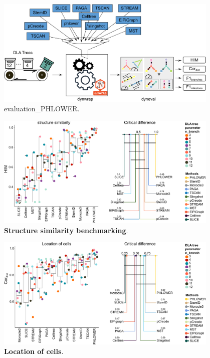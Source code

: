 \begin{figure}[!ht]
	\centering
	\includegraphics[width=0.95\textwidth]{evaluation_PHLOWER/fig}
	\vspace{0.1cm}
	\caption[evaluation\_PHLOWER]{
	evaluation\_PHLOWER.}
	\label{fig:evaluation_PHLOWER}
\end{figure}


\begin{figure}[!ht]
	\centering
	\includegraphics[width=0.95\textwidth]{HIM/fig}
	\vspace{0.1cm}
	\caption[Structure similarity benchmarking]{
	\textbf{Structure similarity benchmarking}.}
	\label{fig:HIM}
\end{figure}


\begin{figure}[!ht]
	\centering
	\includegraphics[width=0.95\textwidth]{Cordist/fig}
	\vspace{0.1cm}
	\caption[Location of cells]{
	\textbf{Location of cells}.}
	\label{fig:Cordist}
\end{figure}


